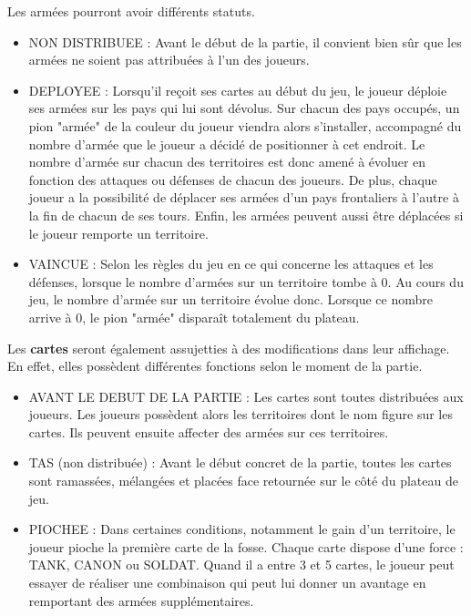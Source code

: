 Les armées pourront avoir différents statuts. 
\begin{itemize}
    \item NON DISTRIBUEE : Avant le début de la partie, il convient bien sûr que les armées ne soient pas attribuées à l'un des joueurs. 
    \item DEPLOYEE : Lorsqu'il reçoit ses cartes au début du jeu, le joueur déploie ses armées sur les pays qui lui sont dévolus. Sur chacun des pays occupés, un pion "armée" de la couleur du joueur viendra alors s'installer, accompagné du nombre d'armée que le joueur a décidé de positionner à cet endroit. Le nombre d'armée sur chacun des territoires est donc amené à évoluer en fonction des attaques ou défenses de chacun des joueurs. De plus, chaque joueur a la possibilité de déplacer ses armées d'un pays frontaliers à l'autre à la fin de chacun de ses tours. Enfin, les armées peuvent aussi être déplacées si le joueur remporte un territoire. 
    \item VAINCUE : Selon les règles du jeu en ce qui concerne les attaques et les défenses, lorsque le nombre d'armées sur un territoire tombe à 0. Au cours du jeu, le nombre d'armée sur un territoire évolue donc. Lorsque ce nombre arrive à 0, le pion "armée" disparaît totalement du plateau.  
    \newline
\end{itemize}

Les \textbf{cartes} seront également assujetties à des modifications dans leur affichage. En effet, elles possèdent différentes fonctions selon le moment de la partie.
\newline 
\newline

\begin{itemize}
    \item AVANT LE DEBUT DE LA PARTIE : Les cartes sont toutes distribuées aux joueurs. Les joueurs possèdent alors les territoires dont le nom figure sur les cartes. Ils peuvent ensuite affecter des armées sur ces territoires.
    \item TAS (non distribuée) : Avant le début concret de la partie, toutes les cartes sont ramassées, mélangées et placées face retournée sur le côté du plateau de jeu. 
    \item PIOCHEE : Dans certaines conditions, notamment le gain d'un territoire, le joueur pioche la première carte de la fosse. Chaque carte dispose d'une force : TANK, CANON ou SOLDAT. Quand il a entre 3 et 5 cartes, le joueur peut essayer de réaliser une combinaison qui peut lui donner un avantage en remportant des armées supplémentaires. 
\end{itemize}

